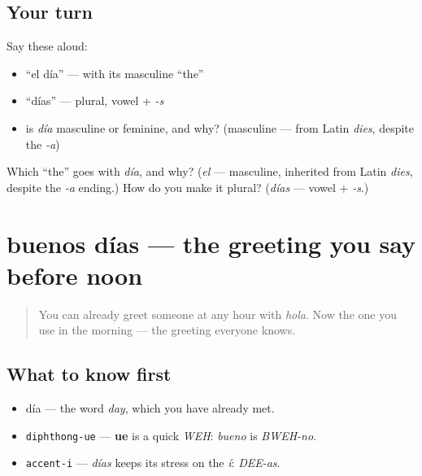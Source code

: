 \subsection*{Your turn}
Say these aloud:

\begin{itemize}
\raggedright
  \item \textquotedblleft{}el día\textquotedblright{} — with its masculine \textquotedblleft{}the\textquotedblright{}
  \item \textquotedblleft{}días\textquotedblright{} — plural, vowel + \emph{-s}
  \item is \emph{día} masculine or feminine, and why? (masculine — from Latin \emph{dies}, despite the \emph{-a})
\end{itemize}

\begin{tcolorbox}[breakable,colback=teal!4,colframe=teal!35!black,title={Before you move on}]
Which \textquotedblleft{}the\textquotedblright{} goes with \emph{día}, and why? (\emph{el} — masculine, inherited from Latin \emph{dies}, despite the \emph{-a} ending.) How do you make it plural? (\emph{días} — vowel + \emph{-s}.)
\end{tcolorbox}
\section[buenos días]{buenos días — the greeting you say before noon}

\label{lesson:ES-C01-buenos-dias}



\begin{quote}
You can already greet someone at any hour with \emph{hola}. Now the one you use in the morning — the greeting everyone knows.
\end{quote}

\subsection*{What to know first}
\begin{itemize}
\raggedright
  \item día — the word \emph{day}, which you have already met.
\end{itemize}

\begin{sounds}
\begin{itemize}
\raggedright
  \item \texttt{diphthong-ue} — \textbf{ue} is a quick \emph{WEH}: \emph{bueno} is \emph{BWEH-no}.
  \item \texttt{accent-i} — \emph{días} keeps its stress on the \emph{í}: \emph{DEE-as}.
\end{itemize}
\end{sounds}

